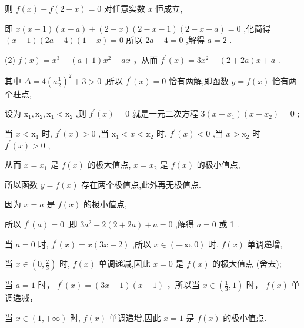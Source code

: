 \documentclass[10pt]{article}
\begin{document}
则 \(f\left( x\right)  + f\left( {2 - x}\right)  = 0\) 对任意实数 \(x\) 恒成立,

即 \(x\left( {x - 1}\right) \left( {x - a}\right)  + \left( {2 - x}\right) \left( {2 - x - 1}\right) \left( {2 - x - a}\right)  = 0\) ,化简得 \(\left( {x - 1}\right) \left( {{2a} - 4}\right) \left( {1 - x}\right)  = 0\) 所以 \({2a} - 4 = 0\) ,解得 \(a = 2\) .

(2) \(f\left( x\right)  = {x}^{3} - \left( {a + 1}\right) {x}^{2} + {ax}\) ，从而 \({f}^{\prime }\left( x\right)  = 3{x}^{2} - \left( {2 + {2a}}\right) x + a\) .

其中 \(\Delta  = 4{\left( a\frac{1}{2}\right) }^{2} + 3 > 0\) ,所以 \({f}^{\prime }\left( x\right)  = 0\) 恰有两解,即函数 \(y = f\left( x\right)\) 恰有两个驻点,

设为 \({\mathrm{x}}_{1},{\mathrm{x}}_{2},{\mathrm{x}}_{1} < {\mathrm{x}}_{2}\) ,则 \({f}^{\prime }\left( x\right)  = 0\) 就是一元二次方程 \(3\left( {x - {x}_{1}}\right) \left( {x - {x}_{2}}\right)  = 0\) ;

当 \(x < {\mathrm{x}}_{1}\) 时, \({f}^{\prime }\left( x\right)  > 0\) ,当 \({\mathrm{x}}_{1} < x < {\mathrm{x}}_{2}\) 时, \({f}^{\prime }\left( x\right)  < 0\) ,当 \(x > {\mathrm{x}}_{2}\) 时 \({f}^{\prime }\left( x\right)  > 0\) ,

从而 \(x = {x}_{1}\) 是 \(f\left( x\right)\) 的极大值点, \(x = {x}_{2}\) 是 \(f\left( x\right)\) 的极小值点,

所以函数 \(y = f\left( x\right)\) 存在两个极值点,此外再无极值点.

因为 \(x = a\) 是 \(f\left( x\right)\) 的极小值点,

所以 \({f}^{\prime }\left( a\right)  = 0\) ,即 \(3{a}^{2} - 2\left( {2 + {2a}}\right)  + a = 0\) ,解得 \(a = 0\) 或 1 .

当 \(a = 0\) 时, \({f}^{\prime }\left( x\right)  = x\left( {{3x} - 2}\right)\) ,所以 \(x \in  \left( {-\infty ,0}\right)\) 时, \(f\left( x\right)\) 单调递增,

当 \(x \in  \left( {0,\frac{2}{3}}\right)\) 时, \(f\left( x\right)\) 单调递减,因此 \(x = 0\) 是 \(f\left( x\right)\) 的极大值点 (舍去);

当 \(a = 1\) 时， \({f}^{\prime }\left( x\right)  = \left( {{3x} - 1}\right) \left( {x - 1}\right)\) ，所以当 \(x \in  \left( {\frac{1}{3},1}\right)\) 时， \(f\left( x\right)\) 单调递减，

当 \(x \in  \left( {1, + \infty }\right)\) 时, \(f\left( x\right)\) 单调递增,因此 \(x = 1\) 是 \(f\left( x\right)\) 的极小值点.
\end{document}
